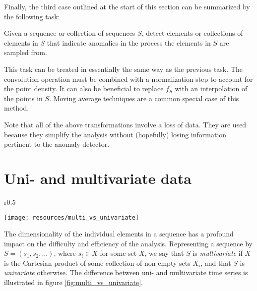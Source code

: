 Finally, the third case outlined at the start of this section can be summarized by the following task: 

\begin{task}
  \label{task:continuous_anomaly_detection}
  Given a sequence or collection of sequences $S$, detect elements or collections of elements in $S$ that indicate anomalies in the process the elements in $S$ are sampled from.
\end{task}

This task can be treated in essentially the same way as the previous task. The convolution operation must be combined with a normalization step to account for the point density. It can also be beneficial to replace $f_S$ with an interpolation of the points in $S$. Moving average techniques are a common special case of this method.

Note that all of the above transformations involve a loss of data. They are used because they simplify the analysis without (hopefully) losing information pertinent to the anomaly detector.

\section{Uni- and multivariate data}
\label{sect:unimultivariate}

\begin{wrapfigure}{r}{0.5\textwidth}
    \vspace{-25pt}
    \begin{center}
        \leavevmode
        \texttt{[image: resources/multi\_vs\_univariate]}
    \end{center}
    \vspace{-15pt}
    \caption{{\small Two sine curves regarded as two separate univariate time series (dotted lines) and as one multivariate time series (solid lines).}}
    \label{fig:multi_vs_univariate}
    \vspace{-25pt}
\end{wrapfigure}

The dimensionality of the individual elements in a sequence has a profound impact on the difficulty and efficiency of the analysis. Representing a sequence by $S = (s_1, s_2, \dots)$, where $s_i \in X$ for some set $X$, we say that $S$ is \emph{multivariate} if $X$ is the Cartesian product of some collection of non-empty sets $X_i$, and that $S$ is \emph{univariate} otherwise. The difference between uni- and multivariate time series is illustrated in figure \ref{fig:multi_vs_univariate}.

